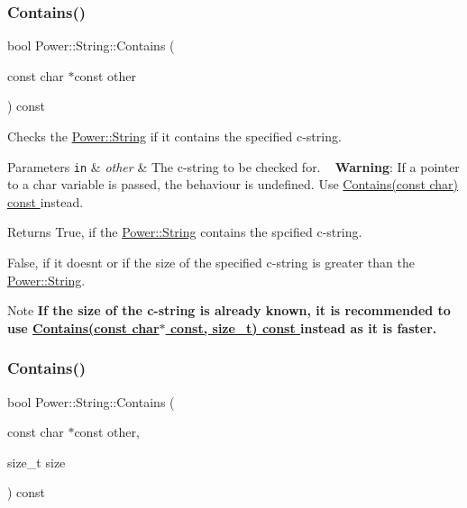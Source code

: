 \subsubsection{\texorpdfstring{Contains()}{Contains()}\hspace{0.1cm}{\footnotesize\ttfamily [2/4]}}
{\footnotesize\ttfamily bool Power\+::\+String\+::\+Contains (\begin{DoxyParamCaption}\item[{const char $\ast$const}]{other }\end{DoxyParamCaption}) const\hspace{0.3cm}{\ttfamily [inline]}}



Checks the \hyperlink{class_power_1_1_string}{Power\+::\+String} if it contains the specified c-\/string. 


\begin{DoxyParams}[1]{Parameters}
\mbox{\tt in}  & {\em other} & The c-\/string to be checked for. ~\newline
 {\bfseries Warning}\+: If a pointer to a char variable is passed, the behaviour is undefined. Use \hyperlink{class_power_1_1_string_a728af5dfae32933d8548a657d7cd2043}{Contains(const char) const }instead. \\
\hline
\end{DoxyParams}
\begin{DoxyReturn}{Returns}
True, if the \hyperlink{class_power_1_1_string}{Power\+::\+String} contains the spcified c-\/string. 

False, if it doesn\textquotesingle{}t or if the size of the specified c-\/string is greater than the \hyperlink{class_power_1_1_string}{Power\+::\+String}. 
\end{DoxyReturn}
\begin{DoxyNote}{Note}
{\bfseries If the size of the c-\/string is already known, it is recommended to use \hyperlink{class_power_1_1_string_a594f79ac18d754ee0cc7c5fed1841eae}{Contains(const char$\ast$ const, size\+\_\+t) const }instead as it is faster.} 
\end{DoxyNote}
\mbox{\label{class_power_1_1_string_a594f79ac18d754ee0cc7c5fed1841eae}} 
\subsubsection{\texorpdfstring{Contains()}{Contains()}\hspace{0.1cm}{\footnotesize\ttfamily [3/4]}}
{\footnotesize\ttfamily bool Power\+::\+String\+::\+Contains (\begin{DoxyParamCaption}\item[{const char $\ast$const}]{other,  }\item[{size\+\_\+t}]{size }\end{DoxyParamCaption}) const\hspace{0.3cm}{\ttfamily [inline]}}



